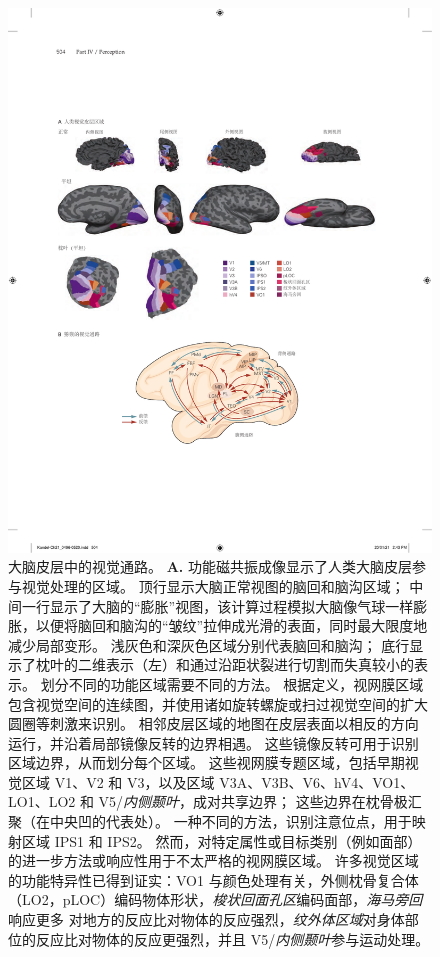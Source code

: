 \begin{figure}[htbp]
	\centering
	\includegraphics[width=0.95\linewidth]{chap21/fig_21_7}
	\caption{大脑皮层中的视觉通路。
		\textbf{A.} 功能磁共振成像显示了人类大脑皮层参与视觉处理的区域。
		顶行显示大脑正常视图的脑回和脑沟区域；
		中间一行显示了大脑的“膨胀”视图，该计算过程模拟大脑像气球一样膨胀，以便将脑回和脑沟的“皱纹”拉伸成光滑的表面，同时最大限度地减少局部变形。
		浅灰色和深灰色区域分别代表脑回和脑沟； 底行显示了枕叶的二维表示（左）和通过沿距状裂进行切割而失真较小的表示。
		划分不同的功能区域需要不同的方法。
		根据定义，视网膜区域包含视觉空间的连续图，并使用诸如旋转螺旋或扫过视觉空间的扩大圆圈等刺激来识别。
		相邻皮层区域的地图在皮层表面以相反的方向运行，并沿着局部镜像反转的边界相遇。
		这些镜像反转可用于识别区域边界，从而划分每个区域。
		这些视网膜专题区域，包括早期视觉区域 V1、V2 和 V3，以及区域 V3A、V3B、V6、hV4、VO1、LO1、LO2 和 V5/\textit{内侧颞叶}，成对共享边界； 这些边界在枕骨极汇聚（在中央凹的代表处）。
		一种不同的方法，识别注意位点，用于映射区域 IPS1 和 IPS2。
		然而，对特定属性或目标类别（例如面部）的进一步方法或响应性用于不太严格的视网膜区域。
		许多视觉区域的功能特异性已得到证实：VO1 与颜色处理有关，外侧枕骨复合体（LO2，pLOC）编码物体形状，\textit{梭状回面孔区}编码面部，\textit{海马旁回}响应更多 对地方的反应比对物体的反应强烈，\textit{纹外体区域}对身体部位的反应比对物体的反应更强烈，并且 V5/\textit{内侧颞叶}参与运动处理。
}
\end{figure}
